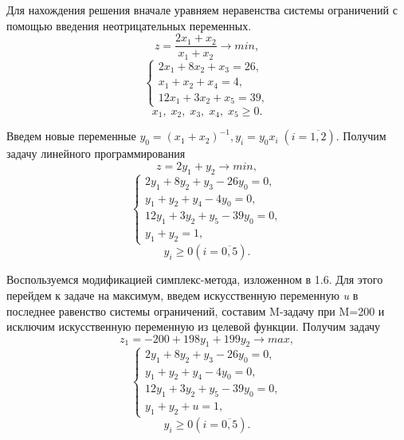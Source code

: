 {Для нахождения решения вначале уравняем неравенства системы ограничений с помощью введения неотрицательных переменных.
\begin{equation*}
z = \frac{2x_{1}+x_{2}}{x_{1}+x_{2}}\rightarrow min,
\end{equation*}
\begin{equation*}
\begin{cases}
2x_{1}+8x_{2}+x_{3} = 26,
\\
x_{1}+x_{2}+x_{4} = 4,
\\
12x_{1}+3x_{2}+x_{5} = 39,
\end{cases}
\end{equation*}
\begin{equation*}
x_{1}, \;x_{2}, \;x_{3}, \;x_{4}, \;x_{5}\geq 0.
\end{equation*}

Введем новые переменные $ y_{0}=(x_{1}+x_{2})^{-1}, y_{i}=y_{0}x_{i}\;(i=\overline{1,2}) $. Получим задачу линейного программирования
\begin{equation*}
z = 2y_{1}+y_{2}\rightarrow min,
\end{equation*}
\begin{equation*}
\begin{cases}
2y_{1}+8y_{2}+y_{3}-26y_{0}=0,
\\
y_{1}+y_{2}+y_{4}-4y_{0}=0,
\\
12y_{1}+3y_{2}+y_{5}-39y_{0}=0,
\\
y_{1}+y_{2}=1,
\end{cases}
\end{equation*}
\begin{equation*}
y_{i}\geq 0 (i=\overline{0, 5}).
\end{equation*}

Воспользуемся модификацией симплекс-метода, изложенном в 1.6. Для этого перейдем к задаче на максимум, введем искусственную переменную \textit{u} в последнее равенство системы ограничений,  составим M-задачу при M=200 и исключим искусственную переменную из целевой функции. Получим задачу
\begin{equation*}
z_{1} = -200 + 198y_{1}+199y_{2}\rightarrow max,
\end{equation*}
\begin{equation*}
\begin{cases}
2y_{1}+8y_{2}+y_{3}-26y_{0}=0,
\\
y_{1}+y_{2}+y_{4}-4y_{0}=0,
\\
12y_{1}+3y_{2}+y_{5}-39y_{0}=0,
\\
y_{1}+y_{2}+u=1,
\end{cases}
\end{equation*}
\begin{equation*}
y_{i}\geq 0 (i=\overline{0, 5}).
\end{equation*}

}
